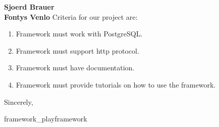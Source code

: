 \documentclass[11pt]{letter} %
\begin{document}
\begin{letter}{\large \bfseries Sjoerd Brauer\\ Fontys Venlo }
		Criteria for our project are:
		\begin{enumerate}
			\item Framework must work with PostgreSQL.
			\item Framework must support http protocol.
			\item Framework must have documentation.
			\item Framework must provide tutorials on how to use the framework.
		\end{enumerate}
	
		\closing{Sincerely,}
		
		
		
		
		
		
		
		 {framework_playframework}







	

		
		
		
		
		
		
	\end{letter}
	
\end{document}
